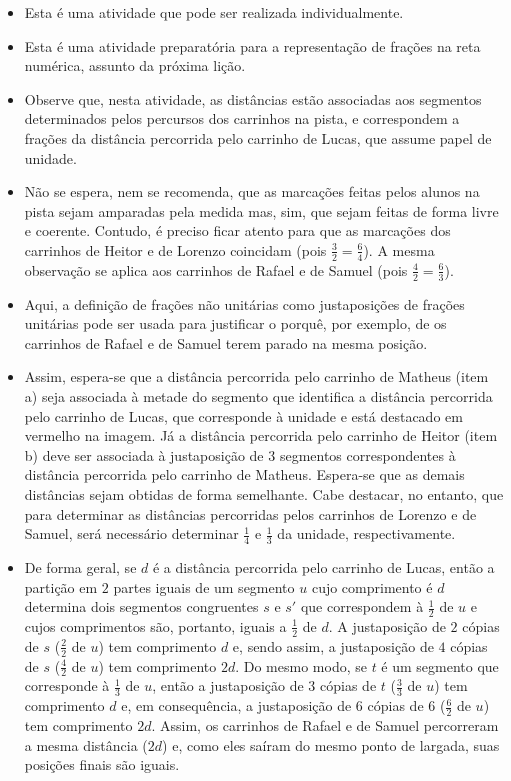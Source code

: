 \begin{multicols}{2}
  \begin{itemize} %
    \item       Esta é uma atividade que pode ser realizada individualmente.
    \item       Esta é uma atividade preparatória para a representação de frações na reta numérica, assunto da próxima lição.
    \item       Observe que, nesta atividade, as distâncias estão associadas aos segmentos determinados pelos percursos dos carrinhos na pista, e correspondem a frações da distância percorrida pelo carrinho de Lucas, que assume papel de unidade.
    \item       Não se espera, nem se recomenda, que as marcações feitas pelos alunos na pista sejam amparadas pela medida mas, sim, que sejam feitas de forma livre e coerente. Contudo, é preciso ficar atento para que as marcações dos carrinhos de Heitor e de Lorenzo coincidam (pois       $\frac{3}{2} = \frac{6}{4}$). A mesma observação se aplica aos carrinhos de Rafael e de Samuel (pois       $\frac{4}{2} = \frac{6}{3}$).
    \item       Aqui, a definição de frações não unitárias como justaposições de frações unitárias pode ser usada para justificar o porquê, por exemplo, de os carrinhos de Rafael e de Samuel terem parado na mesma posição.
    \item       Assim, espera-se que a distância percorrida pelo carrinho de Matheus (item a) seja associada à metade do segmento que identifica a distância percorrida pelo carrinho de Lucas, que corresponde à unidade e está destacado em vermelho na imagem. Já a distância percorrida pelo carrinho de Heitor (item b) deve ser associada à justaposição de       $3$ segmentos correspondentes à distância percorrida pelo carrinho de Matheus. Espera-se que as demais distâncias sejam obtidas de forma semelhante. Cabe destacar, no entanto, que para determinar as distâncias percorridas pelos carrinhos de Lorenzo e de Samuel, será necessário determinar       $\frac{1}{4}$ e       $\frac{1}{3}$ da unidade, respectivamente.
    \item       De forma geral, se       $d$ é a distância percorrida pelo carrinho de Lucas, então a partição em       $2$ partes iguais de um segmento       $u$ cujo comprimento é       $d$ determina dois segmentos congruentes $s$ e $s'$ que correspondem à       $\frac{1}{2}$ de       $u$ e cujos comprimentos são, portanto, iguais a       $\frac{1}{2}$ de       $d$. A justaposição de       $2$ cópias de       $s$ ($\frac{2}{2}$ de       $u$) tem comprimento       $d$ e, sendo assim, a justaposição de       $4$ cópias de       $s$ ($\frac{4}{2}$ de $u$) tem comprimento       $2d$. Do mesmo modo, se       $t$ é um segmento que corresponde à       $\frac{1}{3}$ de       $u$, então a justaposição de       $3$ cópias de       $t$ ($\frac{3}{3}$ de       $u$) tem comprimento       $d$ e, em consequência, a justaposição de       $6$ cópias de       $6$ ($\frac{6}{2}$ de       $u$) tem comprimento       $2d$. Assim, os carrinhos de Rafael e de Samuel percorreram a mesma distância ($2d$) e, como eles saíram do mesmo ponto de largada, suas posições finais são iguais.
\end{itemize} %



\end{multicols}
